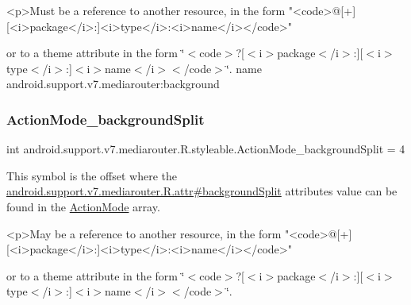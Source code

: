 \begin{DoxyVerb}      <p>Must be a reference to another resource, in the form "<code>@[+][<i>package</i>:]<i>type</i>:<i>name</i></code>"
\end{DoxyVerb}
 or to a theme attribute in the form \char`\"{}$<$code$>$?\mbox{[}$<$i$>$package$<$/i$>$\+:\mbox{]}\mbox{[}$<$i$>$type$<$/i$>$\+:\mbox{]}$<$i$>$name$<$/i$>$$<$/code$>$\char`\"{}.  name android.\+support.\+v7.\+mediarouter\+:background \mbox{\label{classandroid_1_1support_1_1v7_1_1mediarouter_1_1R_1_1styleable_a964de6792a0ef91d9a277bff3796c597}} 
\subsubsection{\texorpdfstring{Action\+Mode\+\_\+background\+Split}{ActionMode\_backgroundSplit}}
{\footnotesize\ttfamily int android.\+support.\+v7.\+mediarouter.\+R.\+styleable.\+Action\+Mode\+\_\+background\+Split = 4\hspace{0.3cm}{\ttfamily [static]}}

This symbol is the offset where the \hyperlink{classandroid_1_1support_1_1v7_1_1mediarouter_1_1R_1_1attr_a92731fe75f35d0af8080a38400e926dd}{android.\+support.\+v7.\+mediarouter.\+R.\+attr\#background\+Split} attribute\textquotesingle{}s value can be found in the \hyperlink{classandroid_1_1support_1_1v7_1_1mediarouter_1_1R_1_1styleable_a4aa490e6088a98056876d4f9227193c8}{Action\+Mode} array.

\begin{DoxyVerb}      <p>May be a reference to another resource, in the form "<code>@[+][<i>package</i>:]<i>type</i>:<i>name</i></code>"
\end{DoxyVerb}
 or to a theme attribute in the form \char`\"{}$<$code$>$?\mbox{[}$<$i$>$package$<$/i$>$\+:\mbox{]}\mbox{[}$<$i$>$type$<$/i$>$\+:\mbox{]}$<$i$>$name$<$/i$>$$<$/code$>$\char`\"{}. 

